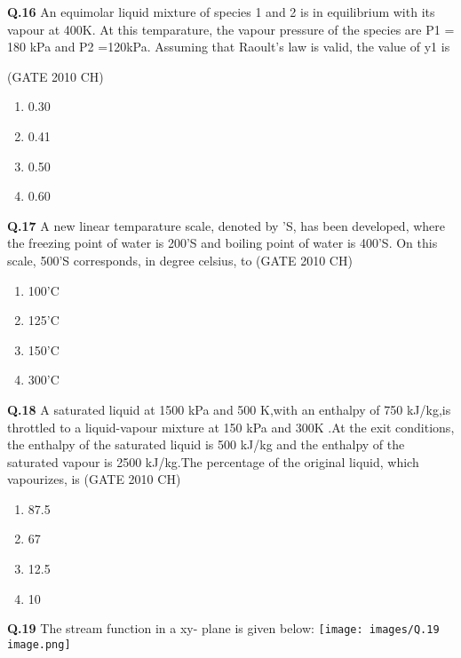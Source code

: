 \documentclass[journal,12pt,onecolumn]{exam}
\theoremstyle{remark}
\begin{document}
 \noindent
 \textbf{Q.16}
   An equimolar liquid mixture of species 1 and 2 is in equilibrium with its vapour at 400K. At this temparature, the vapour pressure of the species are P1 = 180 kPa and P2 =120kPa. Assuming that Raoult's law is valid, the value of y1 is
 
 \hfill{(GATE 2010 CH)}\\

 \begin{enumerate}
     \item 0.30
     \item 0.41
     \item 0.50
     \item 0.60
 \end{enumerate}


\noindent
\textbf{Q.17}
 A new linear temparature scale, denoted by 'S, has been developed, where the freezing point of water is 200'S and boiling point of water is 400'S. On this scale, 500'S corresponds, in degree celsius, to
 \hfill{(GATE 2010 CH)}\\

 \begin{enumerate}
     \item 100'C
     \item 125'C
     \item 150'C
     \item 300'C

 \end{enumerate}


 \noindent
 \textbf{Q.18}
  A saturated liquid at 1500 kPa and 500 K,with an enthalpy of 750 kJ/kg,is throttled to a liquid-vapour mixture at 150 kPa and 300K .At the exit conditions, the enthalpy of the saturated liquid is 500 kJ/kg and the enthalpy of the saturated vapour is 2500 kJ/kg.The percentage of the original liquid, which vapourizes, is
 \hfill{(GATE 2010 CH)}\\

 \begin{enumerate}
     \item 87.5%
     \item 67%
     \item 12.5%
     \item 10%
     
 \end{enumerate}


\noindent
\textbf{Q.19}
   The stream function in a xy- plane is given below:
 \texttt{[image: images/Q.19 image.png]}
\end{document}
